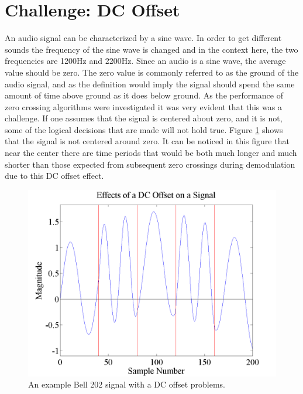 \section{Challenge: DC Offset}
An audio signal can be characterized by a sine wave. In order to get different sounds the frequency of the sine wave is changed and in the context here, the two frequencies are 1200Hz and 2200Hz. Since an audio is a sine wave, the average value should be zero. The zero value is commonly referred to as the ground of the audio signal, and as the definition would imply the signal should spend the same amount of time above ground as it does below ground. As the performance of zero crossing algorithms were investigated it was very evident that this was a challenge. If one assumes that the signal is centered about zero, and it is not, some of the logical decisions that are made will not hold true. Figure \ref{DCOffsetExample} shows that the signal is not centered around zero. It can be noticed in this figure that near the center there are time periods that would be both much longer and much shorter than those expected from subsequent zero crossings during demodulation due to this DC offset effect.
\begin{figure}
  \centering
	\includegraphics[width=0.75\linewidth]{images/EffectsofaDCOffsetonaSignal.png} 
	\caption{An example Bell 202 signal with a DC offset problems.}
   \label{DCOffsetExample}
\end{figure}

